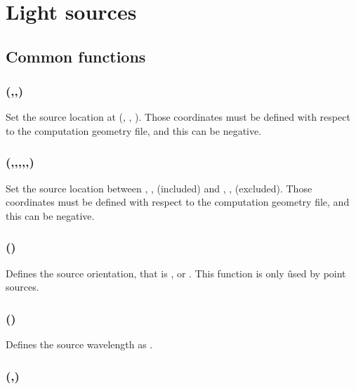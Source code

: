 \section{Light sources}

\label{create_source_def}

\subsection{Common functions}

\subsubsection[location (three arguments)]{(,,)}

Set the source location at (, , ). Those coordinates must be defined with respect to the computation geometry file, and this can be negative.

\subsubsection[location (six arguments)]{(,,,,,)}

Set the source location between , ,  (included) and , ,  (excluded). Those coordinates must be defined with respect to the computation geometry file, and this can be negative.

\subsubsection[orientation]{()}

Defines the source orientation, that is ,  or . This function is only ûsed by point sources.

\subsubsection[spectrum (one argument)]{()}

Defines the source wavelength as .

\subsubsection[spectrum (two arguments)]{(,)}

